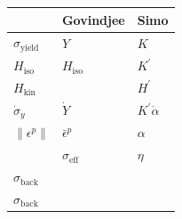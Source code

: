 \begin{longtable}[]{@{}lll@{}}
\toprule\noalign{}
& Govindjee & Simo \\
\midrule\noalign{}
\endhead
\bottomrule\noalign{}
\endlastfoot
\(\sigma_\text{yield}\) & \(Y\) & \(K\) \\
\(H_\text{iso}\) & \(H_\text{iso}\) & \(K^\prime\) \\
\(H_\text{kin}\) & & \(H^\prime\) \\
\(\dot{\sigma}_y\) & \(\dot{Y}\) & \(K^\prime\dot{\alpha}\) \\
\(\|\epsilon^p\|\) & \(\bar{\epsilon}^p\) & \(\alpha\) \\
& \(\sigma_\text{eff}\) & \(\eta\) \\
\(\sigma_\text{back}\) & & \\
\(\sigma_\text{back}\) & & \\
\end{longtable}



